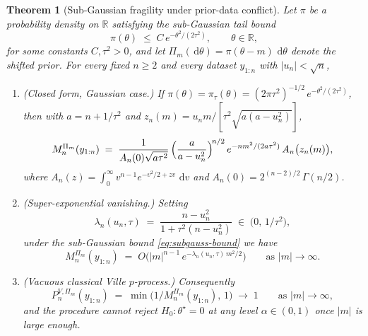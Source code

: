 \documentclass[numsec,webpdf,modern,medium,namedate]{oup-authoring-template}
\theoremstyle{thmstyleone}%
\newtheorem{theorem}{Theorem}%
\theoremstyle{thmstyletwo}%
\theoremstyle{thmstylethree}%
\newcommand{\dd}{\,\mathrm{d}}
\newcommand{\1}{\mathbf{1}}
\begin{document}
\begin{theorem}[Sub-Gaussian fragility under prior-data conflict]
\label{thm:subgaussian-failure}
Let $\pi$ be a probability density on $\mathbb{R}$ satisfying the sub-Gaussian tail bound
\begin{equation}\label{eq:subgauss-bound}
   \pi(\theta) \;\le\; C\, e^{-\theta^{2}/(2\tau^{2})}, \qquad \theta\in\mathbb R,
\end{equation}
for some constants $C,\tau^{2}>0$, and let $\Pi_{m}(\dd\theta)=\pi(\theta-m)\,\dd\theta$ denote the shifted prior. For every fixed $n\ge 2$ and every dataset $y_{1:n}$ with $|u_{n}|<\sqrt n$,
\begin{enumerate}%
\item[(i)] (Closed form, Gaussian case.) If $\pi(\theta)=\pi_{\tau}(\theta)=(2\pi\tau^{2})^{-1/2}\,e^{-\theta^{2}/(2\tau^{2})}$, then with
   $a=n+1/\tau^{2}$ and
   $z_{n}(m)=u_{n}m/[\tau^{2}\sqrt{a(a-u_{n}^{2})}]$,
   \begin{equation}\label{eq:M-closed-Gauss}
      M_{n}^{\Pi_{m}}(y_{1:n}) \;=\; \frac{1}{A_{n}(0)\sqrt{a\tau^{2}}}\,\Bigl(\frac{a}{a-u_{n}^{2}}\Bigr)^{\!n/2}\, e^{-nm^{2}/(2a\tau^{2})}\, A_{n}\bigl(z_{n}(m)\bigr),
   \end{equation}
   where $A_{n}(z)=\int_{0}^{\infty}v^{n-1}e^{-v^{2}/2+zv}\,\dd v$ and $A_{n}(0)=2^{(n-2)/2}\,\Gamma(n/2)$.
\item[(ii)] \emph{(Super-exponential vanishing.)} Setting
   \begin{equation}\label{eq:lambda-def}
      \lambda_{n}(u_{n},\tau) \;=\; \frac{n-u_{n}^{2}}{1+\tau^{2}(n-u_{n}^{2})} \;\in\;\bigl(0,\,1/\tau^{2}\bigr),
   \end{equation}
   under the sub-Gaussian bound \eqref{eq:subgauss-bound} we have
   \begin{equation}\label{eq:decay-rate}
      M_{n}^{\Pi_{m}}(y_{1:n}) \;=\; O\!\bigl(|m|^{n-1}\,e^{-\lambda_{n}(u_{n},\tau)\,m^{2}/2}\bigr) \qquad\text{as }|m|\to\infty.
   \end{equation}
\item[(iii)] \emph{(Vacuous classical Ville $p$-process.)} Consequently
   \[
      P_{n}^{V,\Pi_{m}}(y_{1:n}) \;=\; \min\!\bigl(1/M_{n}^{\Pi_{m}}(y_{1:n}),\,1\bigr) \;\longrightarrow\; 1
      \qquad\text{as }|m|\to\infty,
   \]
   and the procedure cannot reject $H_{0}\colon\theta^{\star}=0$ at any level $\alpha\in(0,1)$ once $|m|$ is large enough.
\end{enumerate}
\end{theorem}
\end{document}

